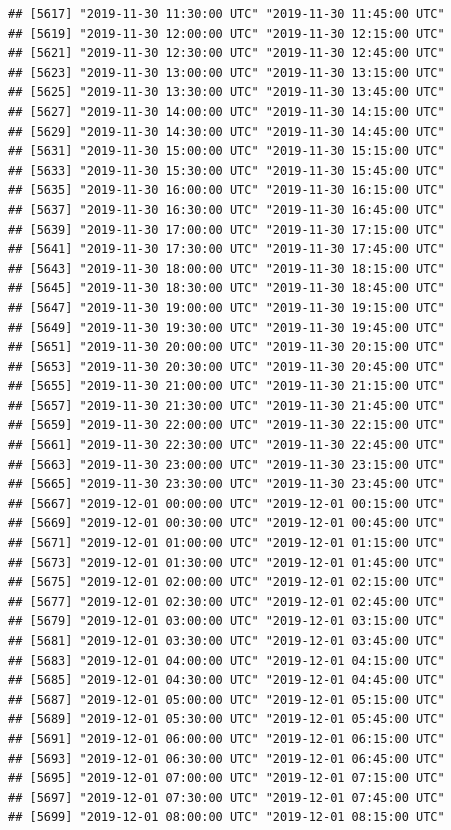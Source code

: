 \documentclass{article}\usepackage[]{graphicx}\usepackage[]{color}
\makeatletter
\newenvironment{kframe}{%
 \def\at@end@of@kframe{}%
 \ifinner\ifhmode%
  \def\at@end@of@kframe{\end{minipage}}%
  \begin{minipage}{\columnwidth}%
 \fi\fi%
 \def\FrameCommand##1{\hskip\@totalleftmargin \hskip-\fboxsep
 \colorbox{shadecolor}{##1}\hskip-\fboxsep
     \hskip-\linewidth \hskip-\@totalleftmargin \hskip\columnwidth}%
 \MakeFramed {\advance\hsize-\width
   \@totalleftmargin\z@ \linewidth\hsize
   \@setminipage}}%
 {\par\unskip\endMakeFramed%
 \at@end@of@kframe}
\newenvironment{knitrout}{}{} %
\makeatother
\begin{document}
\begin{knitrout}
\begin{kframe}
\begin{verbatim}
## [5617] "2019-11-30 11:30:00 UTC" "2019-11-30 11:45:00 UTC"
## [5619] "2019-11-30 12:00:00 UTC" "2019-11-30 12:15:00 UTC"
## [5621] "2019-11-30 12:30:00 UTC" "2019-11-30 12:45:00 UTC"
## [5623] "2019-11-30 13:00:00 UTC" "2019-11-30 13:15:00 UTC"
## [5625] "2019-11-30 13:30:00 UTC" "2019-11-30 13:45:00 UTC"
## [5627] "2019-11-30 14:00:00 UTC" "2019-11-30 14:15:00 UTC"
## [5629] "2019-11-30 14:30:00 UTC" "2019-11-30 14:45:00 UTC"
## [5631] "2019-11-30 15:00:00 UTC" "2019-11-30 15:15:00 UTC"
## [5633] "2019-11-30 15:30:00 UTC" "2019-11-30 15:45:00 UTC"
## [5635] "2019-11-30 16:00:00 UTC" "2019-11-30 16:15:00 UTC"
## [5637] "2019-11-30 16:30:00 UTC" "2019-11-30 16:45:00 UTC"
## [5639] "2019-11-30 17:00:00 UTC" "2019-11-30 17:15:00 UTC"
## [5641] "2019-11-30 17:30:00 UTC" "2019-11-30 17:45:00 UTC"
## [5643] "2019-11-30 18:00:00 UTC" "2019-11-30 18:15:00 UTC"
## [5645] "2019-11-30 18:30:00 UTC" "2019-11-30 18:45:00 UTC"
## [5647] "2019-11-30 19:00:00 UTC" "2019-11-30 19:15:00 UTC"
## [5649] "2019-11-30 19:30:00 UTC" "2019-11-30 19:45:00 UTC"
## [5651] "2019-11-30 20:00:00 UTC" "2019-11-30 20:15:00 UTC"
## [5653] "2019-11-30 20:30:00 UTC" "2019-11-30 20:45:00 UTC"
## [5655] "2019-11-30 21:00:00 UTC" "2019-11-30 21:15:00 UTC"
## [5657] "2019-11-30 21:30:00 UTC" "2019-11-30 21:45:00 UTC"
## [5659] "2019-11-30 22:00:00 UTC" "2019-11-30 22:15:00 UTC"
## [5661] "2019-11-30 22:30:00 UTC" "2019-11-30 22:45:00 UTC"
## [5663] "2019-11-30 23:00:00 UTC" "2019-11-30 23:15:00 UTC"
## [5665] "2019-11-30 23:30:00 UTC" "2019-11-30 23:45:00 UTC"
## [5667] "2019-12-01 00:00:00 UTC" "2019-12-01 00:15:00 UTC"
## [5669] "2019-12-01 00:30:00 UTC" "2019-12-01 00:45:00 UTC"
## [5671] "2019-12-01 01:00:00 UTC" "2019-12-01 01:15:00 UTC"
## [5673] "2019-12-01 01:30:00 UTC" "2019-12-01 01:45:00 UTC"
## [5675] "2019-12-01 02:00:00 UTC" "2019-12-01 02:15:00 UTC"
## [5677] "2019-12-01 02:30:00 UTC" "2019-12-01 02:45:00 UTC"
## [5679] "2019-12-01 03:00:00 UTC" "2019-12-01 03:15:00 UTC"
## [5681] "2019-12-01 03:30:00 UTC" "2019-12-01 03:45:00 UTC"
## [5683] "2019-12-01 04:00:00 UTC" "2019-12-01 04:15:00 UTC"
## [5685] "2019-12-01 04:30:00 UTC" "2019-12-01 04:45:00 UTC"
## [5687] "2019-12-01 05:00:00 UTC" "2019-12-01 05:15:00 UTC"
## [5689] "2019-12-01 05:30:00 UTC" "2019-12-01 05:45:00 UTC"
## [5691] "2019-12-01 06:00:00 UTC" "2019-12-01 06:15:00 UTC"
## [5693] "2019-12-01 06:30:00 UTC" "2019-12-01 06:45:00 UTC"
## [5695] "2019-12-01 07:00:00 UTC" "2019-12-01 07:15:00 UTC"
## [5697] "2019-12-01 07:30:00 UTC" "2019-12-01 07:45:00 UTC"
## [5699] "2019-12-01 08:00:00 UTC" "2019-12-01 08:15:00 UTC"

\end{verbatim}
\end{kframe}
\end{knitrout}
\end{document}
